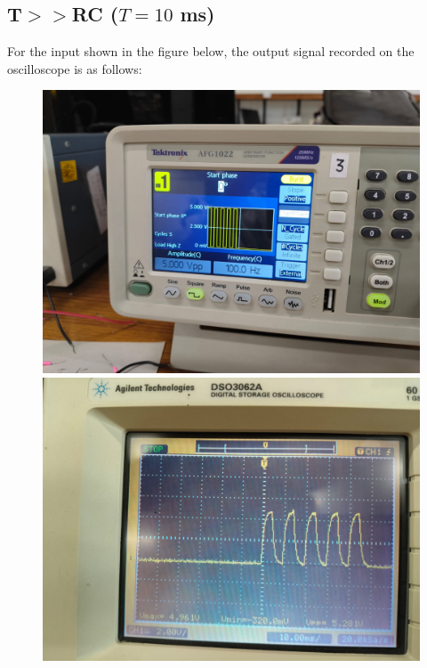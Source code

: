 \documentclass[a4paper,12pt]{article}
\begin{document}
\subsection{T$>>$RC  ($T=10$ ms)}
For the input shown in the figure below, the output signal recorded on the oscilloscope is as follows:
\begin{figure}[h]
    \centering
    \begin{minipage}{0.45\textwidth}
        \centering
        \includegraphics[width=\textwidth]{figs/T100para.jpeg}
    \end{minipage}\hfill
    \begin{minipage}{0.45\textwidth}
        \centering
        \includegraphics[width=\textwidth]{figs/T100plot.jpeg}
    \end{minipage}
\end{figure}
\end{document}
